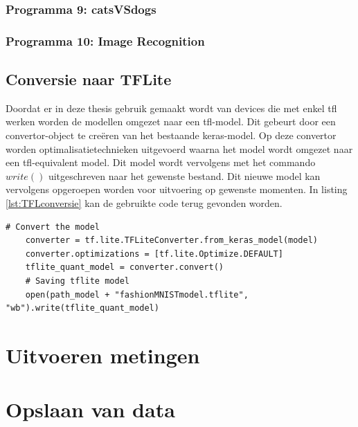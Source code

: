 		\subsubsection{Programma 9: catsVSdogs}
		\subsubsection{Programma 10: Image Recognition}
	\subsection{Conversie naar TFLite}
		Doordat er in deze thesis gebruik gemaakt wordt van devices die met enkel \gls{tfl} werken worden de modellen omgezet naar een \gls{tfl}-model. Dit gebeurt door een convertor-object te cre\"eren van het bestaande keras-model. Op deze convertor worden optimalisatietechnieken uitgevoerd waarna het model wordt omgezet naar een \gls{tfl}-equivalent model. Dit model wordt vervolgens met het commando $write()$ uitgeschreven naar het gewenste bestand. Dit nieuwe model kan vervolgens opgeroepen worden voor uitvoering op gewenste momenten. In listing \ref{lst:TFLconversie} kan de gebruikte code terug gevonden worden.
	\begin{lstlisting}[caption={Converteren naar een \gls{tfl}-model.}, captionpos=b,label={lst:TFLconversie}]
	# Convert the model
	converter = tf.lite.TFLiteConverter.from_keras_model(model)
	converter.optimizations = [tf.lite.Optimize.DEFAULT]
	tflite_quant_model = converter.convert()
	# Saving tflite model
	open(path_model + "fashionMNISTmodel.tflite", "wb").write(tflite_quant_model)
	\end{lstlisting}	
\section{Uitvoeren metingen}


\section{Opslaan van data}
